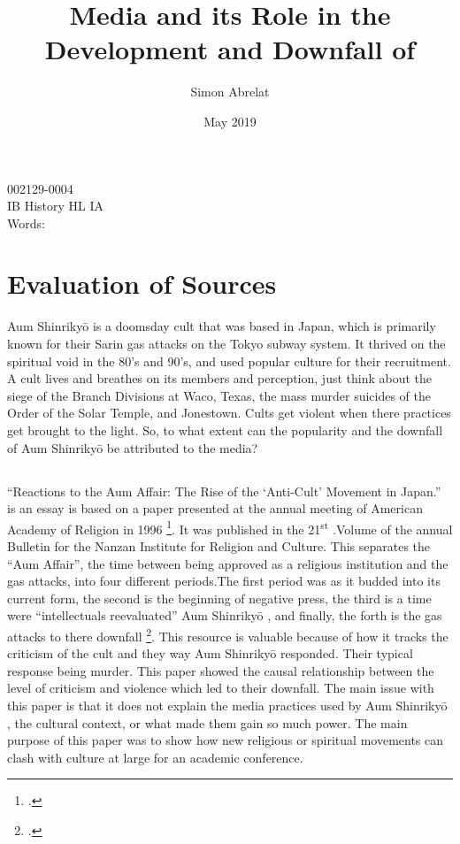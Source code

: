 \documentclass[12pt, letterpaper]{article}
\title{Media and its Role in the Development and Downfall of \Aum{}}
\author{Simon Abrelat}
\date{May 2019}
\newcommand{\sorta}[1]{`#1'}
\newcommand{\poses}[1]{#1's}
\newcommand{\say}[1]{``#1''}
\newcommand{\Aum}[0]{Aum Shinriky\=o }
\begin{document}
\doublespace{}
\parindent=0.5in

{\fontsize{12}{14.4}
  {\singlespace
    \maketitle
    \begin{center}
    002129-0004 \\
    \vspace{4mm}
    IB History HL IA \\
    \vspace{4mm}
    Words:  \\ %
    \end{center}
  }
}	


\newpage
\tableofcontents
{}
\newpage

\section{Evaluation of Sources}
\Aum{} is a doomsday cult that was based in Japan, which is primarily known for their Sarin gas
attacks on the Tokyo subway system. It thrived on the spiritual void in the \poses{80} and  \poses{90},
and used popular culture for their recruitment. A cult lives and breathes on its members and perception,
just think about the siege of the Branch Divisions at Waco, Texas, the mass murder suicides of the Order of
the Solar Temple, and Jonestown. Cults get violent when there practices get brought to the light. So, to
what extent can the popularity and the downfall of \Aum{} be attributed to the media?

\subsection{}
\say{Reactions to the Aum Affair: The Rise of the \sorta{Anti-Cult} Movement in Japan.} is an essay is
based on a paper presented at the annual meeting of American Academy of Religion in 1996
\footcite{MediaStages}. It was published in the 21\textsuperscript{st} .Volume of the annual Bulletin for
the Nanzan Institute for Religion and Culture. This separates the \say{Aum Affair}, the time between being
approved as a religious institution and the gas attacks, into four different periods.The first period was
as it budded into its current form, the second is the beginning of negative press, the third is a time were
\say{intellectuals reevaluated} \Aum, and finally, the forth is the gas attacks to there downfall \footcite[33]{MediaStages}. This
resource is valuable because of how it tracks the criticism of the cult and they way \Aum responded. Their
typical response being murder. This paper showed the causal relationship between the level of criticism and
violence which led to their downfall. The main issue with this paper is that it does not explain the media
practices used by \Aum, the cultural context, or what made them gain so much power. The main purpose of 
this paper was to show how new religious or spiritual movements can clash with culture at large for an
academic conference.
\end{document}
